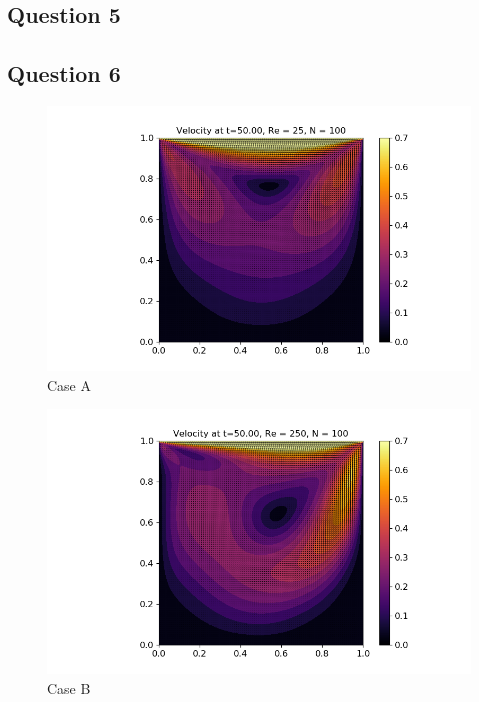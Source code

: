 \documentclass[10pt]{report}
\begin{document}
\subsection*{Question 5}
\subsection*{Question 6}

\begin{figure}[H]
    \centering
    \includegraphics[width = \textwidth]{figures/velocity_A.png}
    \caption{Case A}
    \label{caseA}
\end{figure}
\begin{figure}[H]
    \centering
    \includegraphics[width = \textwidth]{figures/velocity_B.png}
    \caption{Case B}
    \label{caseB}
\end{figure}
\end{document}
